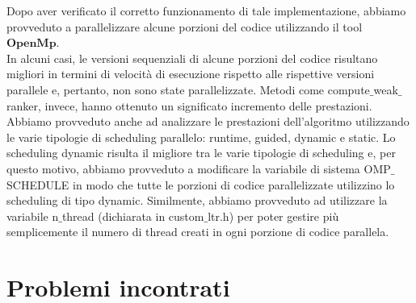Dopo aver verificato il corretto funzionamento di tale implementazione, abbiamo provveduto a parallelizzare alcune porzioni del codice utilizzando il tool $\textbf{OpenMp}$. \\
In alcuni casi, le versioni sequenziali di alcune porzioni del codice risultano migliori in termini di velocità di esecuzione rispetto alle rispettive versioni parallele e, pertanto, non sono state parallelizzate. Metodi come compute$\_$weak$\_$ranker, invece, hanno ottenuto un significato incremento delle prestazioni. \\
Abbiamo provveduto anche ad analizzare le prestazioni dell'algoritmo utilizzando le varie tipologie di scheduling parallelo: runtime, guided, dynamic e static. Lo scheduling dynamic risulta il migliore tra le varie tipologie di scheduling e, per questo motivo, abbiamo provveduto a modificare la variabile di sistema OMP$\_$SCHEDULE in modo che tutte le porzioni di codice parallelizzate utilizzino lo scheduling di tipo dynamic. Similmente, abbiamo provveduto ad utilizzare la variabile n$\_$thread (dichiarata in custom$\_$ltr.h) per poter gestire più semplicemente il numero di thread creati in ogni porzione di codice parallela.

	\section*{Problemi incontrati}

